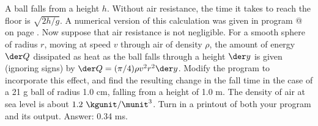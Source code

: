   A ball falls from a height $h$. Without air resistance, the time it takes
  to reach the floor is $\sqrt{2h/g}$. A numerical version of this calculation was given
  in program @ on page  \pageref{program-time2}. Now suppose
  that air resistance is not negligible. For a smooth sphere of radius $r$, moving
  at speed $v$ through air of density $\rho$, the amount of energy $\der Q$ dissipated as
  heat as the ball falls through a height $\der y$ is given (ignoring signs)
  by $\der Q = (\pi/4)\rho v^2 r^2 \der y$. Modify the program to incorporate this effect,
  and find the resulting change in the fall time in the case of a 21 g ball of radius 1.0 cm,
  falling from a height of 1.0 m. The density of air at sea level is about $1.2\ \kgunit/\munit^3$.
  Turn in a printout of both your program and its output.
  Answer: 0.34 ms.

